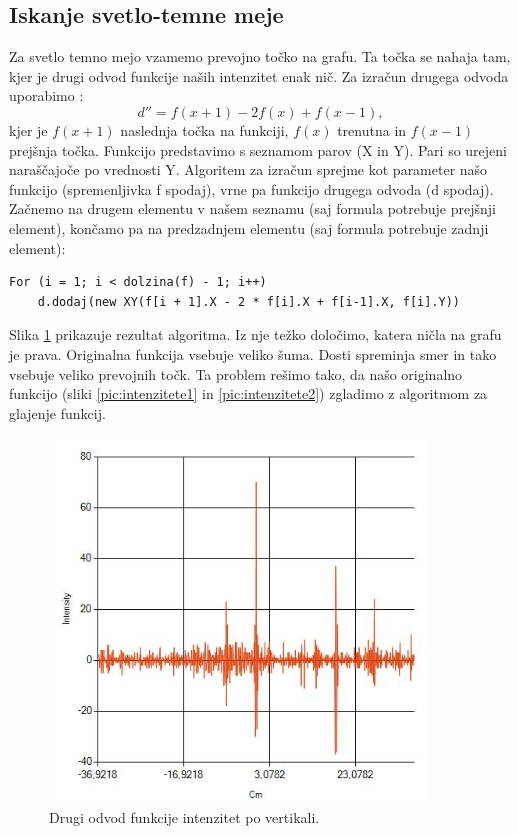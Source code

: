 \documentclass[oneside, a4paper, 12pt]{book}
\begin{document}
\subsection{Iskanje svetlo-temne meje}
\begin{samepage}
Za svetlo temno mejo vzamemo prevojno točko na grafu. Ta točka se nahaja tam, kjer je drugi odvod funkcije naših intenzitet enak nič. Za izračun drugega odvoda uporabimo \cite{second-d}:
\begin{equation}
d''=f(x+1) - 2f(x) + f(x-1),
\end{equation}
kjer je $f(x+1)$ naslednja točka na funkciji, $f(x)$ trenutna in $f(x-1)$ prejšnja točka. Funkcijo predstavimo s seznamom parov (X in Y). Pari so urejeni naraščajoče po vrednosti Y. Algoritem za izračun sprejme kot parameter našo funkcijo (spremenljivka f spodaj), vrne pa funkcijo drugega odvoda (d spodaj). Začnemo na drugem elementu v našem seznamu (saj formula potrebuje prejšnji element), končamo pa na predzadnjem elementu (saj formula potrebuje zadnji element):

\begin{verbatim}
For (i = 1; i < dolzina(f) - 1; i++) 
    d.dodaj(new XY(f[i + 1].X - 2 * f[i].X + f[i-1].X, f[i].Y))
\end{verbatim}
\end{samepage}

Slika \ref{pic:d2} prikazuje rezultat algoritma. Iz nje težko določimo, katera ničla na grafu je prava. Originalna funkcija vsebuje veliko šuma. Dosti spreminja smer in tako vsebuje veliko prevojnih točk. Ta problem rešimo tako, da našo originalno funkcijo (sliki \ref{pic:intenzitete1} in \ref{pic:intenzitete2}) zgladimo z algoritmom za glajenje funkcij.
\begin{figure}
\begin{center}
\includegraphics[width=10cm]{slike/drugi-odvod-1.jpg}
\end{center}
\caption{Drugi odvod funkcije intenzitet po vertikali.}
\label{pic:d2}
\end{figure}
\end{document}
